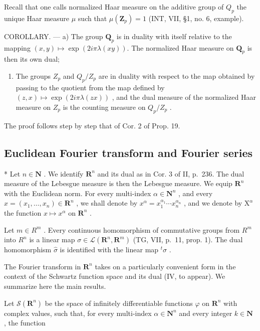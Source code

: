 Recall that one calls normalized Haar measure on the additive group of \(Q_{p}\) the unique Haar measure \(\mu\) such that \(\mu(\mathbf{Z}_{p}) = 1\) (INT, VII, §1, no. 6, example).

COROLLARY. --- a) The group \(\mathbf{Q}_{p}\) is in duality with itself relative to the mapping \((x,y)\mapsto\exp(2i\pi\lambda(xy))\). The normalized Haar measure on \(\mathbf{Q}_{p}\) is then its own dual;

\begin{enumerate}
\def\labelenumi{\alph{enumi})}
\setcounter{enumi}{1}
\tightlist
\item
  The groups \(Z_{p}\) and \(Q_{p}/Z_{p}\) are in duality with respect to the map obtained by passing to the quotient from the map defined by \((z,x)\mapsto\exp(2i\pi\lambda(zx))\) , and the dual measure of the normalized Haar measure on \(Z_{p}\) is the counting measure on \(Q_{p}/Z_{p}\) .
\end{enumerate}

The proof follows step by step that of Cor. 2 of Prop. 19.

\subsection{Euclidean Fourier transform and Fourier series}

* Let \(n \in \mathbf{N}\) . We identify \(\mathbf{R}^n\) and its dual as in Cor. 3 of II, p.~236. The dual measure of the Lebesgue measure is then the Lebesgue measure. We equip \(\mathbf{R}^n\) with the Euclidean norm. For every multi-index \(\alpha \in \mathbf{N}^n\) , and every \(x = (x_1, \ldots, x_n) \in \mathbf{R}^n\) , we shall denote by \(x^\alpha = x_1^{\alpha_1} \cdots x_n^{\alpha_n}\) , and we denote by \(\mathrm{X}^\alpha\) the function \(x \mapsto x^\alpha\) on \(\mathbf{R}^n\) .

Let \(m \in R^{m}\) . Every continuous homomorphism of commutative groups from \(R^{m}\) into \(R^{n}\) is a linear map \(\sigma \in \mathcal{L}(\mathbf{R}^{n}, \mathbf{R}^{m})\) (TG, VII, p.~11, prop. 1). The dual homomorphism \(\widehat{\sigma}\) is identified with the linear map \(^{t}\sigma\) .

The Fourier transform in \(\mathbf{R}^n\) takes on a particularly convenient form in the context of the Schwartz function space and its dual (IV, to appear). We summarize here the main results.

Let \(\mathcal{S}(\mathbf{R}^{n})\) be the space of infinitely differentiable functions \(\varphi\) on \(\mathbf{R}^{n}\) with complex values, such that, for every multi-index \(\alpha\in\mathbf{N}^{n}\) and every integer \(k\in\mathbf{N}\) , the function


